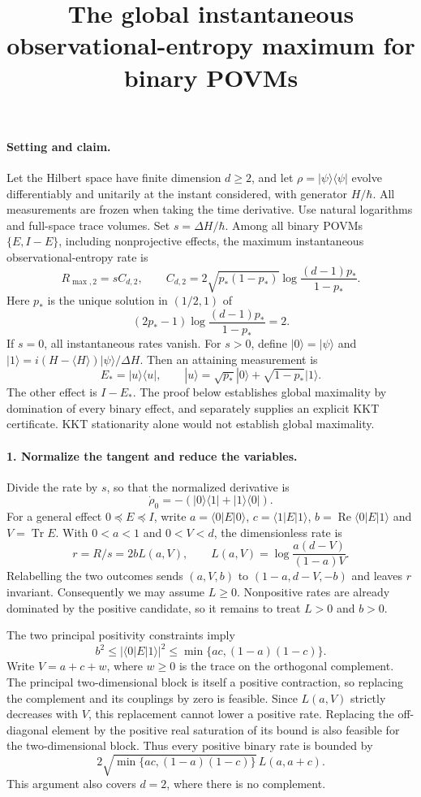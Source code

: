 \documentclass[11pt,a4paper]{article}
\newcommand{\Tr}{\operatorname{Tr}}
\begin{document}
\title{The global instantaneous observational-entropy maximum for binary POVMs}
\author{}
\date{}
\maketitle
\paragraph{Setting and claim.} Let the Hilbert space have finite dimension $d\geq2$, and let $\rho=|\psi\rangle\langle\psi|$ evolve differentiably and unitarily at the instant considered, with generator $H/\hbar$. All measurements are frozen when taking the time derivative. Use natural logarithms and full-space trace volumes. Set $s=\Delta H/\hbar$. Among all binary POVMs $\{E,I-E\}$, including nonprojective effects, the maximum instantaneous observational-entropy rate is
\[R_{\max,2}=s C_{d,2},\qquad C_{d,2}=2\sqrt{p_*(1-p_*)}\log\frac{(d-1)p_*}{1-p_*}.\]
Here $p_*$ is the unique solution in $(1/2,1)$ of
\[(2p_*-1)\log\frac{(d-1)p_*}{1-p_*}=2.\]
If $s=0$, all instantaneous rates vanish. For $s>0$, define $|0\rangle=|\psi\rangle$ and $|1\rangle=i(H-\langle H\rangle)|\psi\rangle/\Delta H$. Then an attaining measurement is
\[E_*=|u\rangle\langle u|,\qquad |u\rangle=\sqrt{p_*}|0\rangle+\sqrt{1-p_*}|1\rangle.\]
The other effect is $I-E_*$. The proof below establishes global maximality by domination of every binary effect, and separately supplies an explicit KKT certificate. KKT stationarity alone would not establish global maximality.
\paragraph{1. Normalize the tangent and reduce the variables.} Divide the rate by $s$, so that the normalized derivative is
\[\dot\rho_0=-(|0\rangle\langle1|+|1\rangle\langle0|).\]
For a general effect $0\preceq E\preceq I$, write $a=\langle0|E|0\rangle$, $c=\langle1|E|1\rangle$, $b=\operatorname{Re}\langle0|E|1\rangle$ and $V=\Tr E$. With $0<a<1$ and $0<V<d$, the dimensionless rate is
\[r=R/s=2bL(a,V),\qquad L(a,V)=\log\frac{a(d-V)}{(1-a)V}.\]
Relabelling the two outcomes sends $(a,V,b)$ to $(1-a,d-V,-b)$ and leaves $r$ invariant. Consequently we may assume $L\geq0$. Nonpositive rates are already dominated by the positive candidate, so it remains to treat $L>0$ and $b>0$.

The two principal positivity constraints imply
\[b^2\leq|\langle0|E|1\rangle|^2\leq\min\{ac,(1-a)(1-c)\}.\]
Write $V=a+c+w$, where $w\geq0$ is the trace on the orthogonal complement. The principal two-dimensional block is itself a positive contraction, so replacing the complement and its couplings by zero is feasible. Since $L(a,V)$ strictly decreases with $V$, this replacement cannot lower a positive rate. Replacing the off-diagonal element by the positive real saturation of its bound is also feasible for the two-dimensional block. Thus every positive binary rate is bounded by
\[2\sqrt{\min\{ac,(1-a)(1-c)\}}\,L(a,a+c).\]
This argument also covers $d=2$, where there is no complement.
\end{document}
